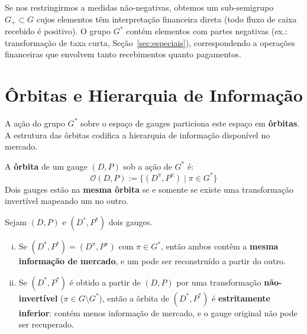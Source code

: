 \begin{obs}
Se nos restringirmos a medidas n\~ao-negativas, obtemos um
sub-semigrupo $G_+ \subset G$ cujos elementos t\^em interpreta\c{c}\~ao
financeira direta (todo fluxo de caixa recebido \'e positivo). O grupo
$G^*$ cont\'em elementos com partes negativas (ex.: transforma\c{c}\~ao
de taxa curta, Se\c{c}\~ao~\ref{sec:especiais}), correspondendo a
opera\c{c}\~oes financeiras que envolvem tanto recebimentos quanto
pagamentos.
\end{obs}

\section{\^Orbitas e Hierarquia de Informa\c{c}\~ao}

A a\c{c}\~ao do grupo $G^*$ sobre o espa\c{c}o de gauges particiona
este espa\c{c}o em \textbf{\^orbitas}. A estrutura das \^orbitas
codifica a hierarquia de informa\c{c}\~ao dispon\'ivel no mercado.

\begin{defi}\label{def:orbita}
A \textbf{\^orbita} de um gauge $(D,P)$ sob a a\c{c}\~ao de $G^*$ \'e:
\[
\mathcal{O}(D,P) := \{(D^\pi, P^\pi) \mid \pi \in G^*\}
\]
Dois gauges est\~ao na \textbf{mesma \^orbita} se e somente se existe
uma transforma\c{c}\~ao invert\'ivel mapeando um no outro.
\end{defi}

\begin{prop}\label{prop:hierarquia}
Sejam $(D,P)$ e $(D^*,P^*)$ dois gauges.
\begin{enumerate}[(i)]
 \item Se $(D^*,P^*) = (D^\pi, P^\pi)$ com $\pi \in G^*$, ent\~ao
 ambos cont\^em a \textbf{mesma informa\c{c}\~ao de mercado}, e
 um pode ser reconstru\'ido a partir do outro.
 \item Se $(D^*,P^*)$ \'e obtido a partir de $(D,P)$ por uma
 transforma\c{c}\~ao \textbf{n\~ao-invert\'ivel}
 ($\pi \in G \setminus G^*$), ent\~ao a \^orbita de $(D^*,P^*)$
 \'e \textbf{estritamente inferior}: cont\'em menos
 informa\c{c}\~ao de mercado, e o gauge original n\~ao pode ser
 recuperado.
\end{enumerate}
\end{prop}

